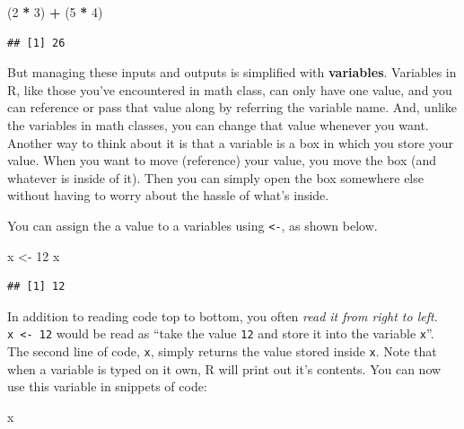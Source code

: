 \documentclass[
]{book}
\newenvironment{Shaded}{\begin{snugshade}}{\end{snugshade}}
\newcommand{\DecValTok}[1]{\textcolor[rgb]{0.00,0.00,0.81}{#1}}
\newcommand{\NormalTok}[1]{#1}
\newcommand{\OtherTok}[1]{\textcolor[rgb]{0.56,0.35,0.01}{#1}}
\newcommand{\SpecialCharTok}[1]{\textcolor[rgb]{0.81,0.36,0.00}{\textbf{#1}}}
\begin{document}
\begin{Shaded}
\begin{Highlighting}[]
\NormalTok{(}\DecValTok{2} \SpecialCharTok{*} \DecValTok{3}\NormalTok{) }\SpecialCharTok{+}\NormalTok{ (}\DecValTok{5} \SpecialCharTok{*} \DecValTok{4}\NormalTok{)}
\end{Highlighting}
\end{Shaded}

\begin{verbatim}
## [1] 26
\end{verbatim}

But managing these inputs and outputs is simplified with \textbf{variables}. Variables in R, like those you've encountered in math class, can only have one value, and you can reference or pass that value along by referring the variable name. And, unlike the variables in math classes, you can change that value whenever you want. Another way to think about it is that a variable is a box in which you store your value. When you want to move (reference) your value, you move the box (and whatever is inside of it). Then you can simply open the box somewhere else without having to worry about the hassle of what's inside.

You can assign the a value to a variables using \texttt{\textless{}-}, as shown below.

\begin{Shaded}
\begin{Highlighting}[]
\NormalTok{x }\OtherTok{\textless{}{-}} \DecValTok{12}
\NormalTok{x}
\end{Highlighting}
\end{Shaded}

\begin{verbatim}
## [1] 12
\end{verbatim}

In addition to reading code top to bottom, you often \emph{read it from right to left}. \texttt{x\ \textless{}-\ 12} would be read as ``take the value \texttt{12} and store it into the variable \texttt{x}''. The second line of code, \texttt{x}, simply returns the value stored inside \texttt{x}. Note that when a variable is typed on it own, R will print out it's contents. You can now use this variable in snippets of code:

\begin{Shaded}
\begin{Highlighting}[]
\NormalTok{x}
\end{Highlighting}
\end{Shaded}
\end{document}
